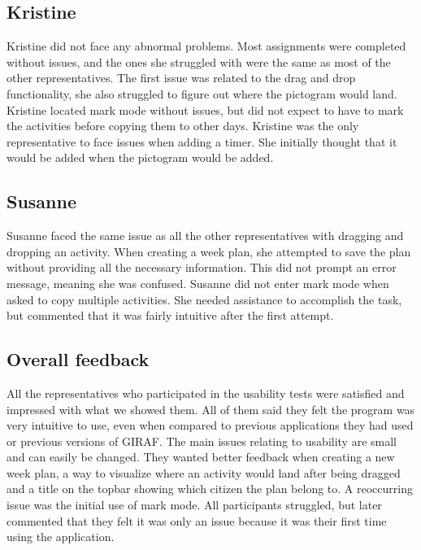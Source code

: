 \subsection{Kristine}
Kristine did not face any abnormal problems.
Most assignments were completed without issues, and the ones she struggled with were the same as most of the other representatives.
The first issue was related to the drag and drop functionality, she also struggled to figure out where the pictogram would land.
Kristine located mark mode without issues, but did not expect to have to mark the activities before copying them to other days. 
Kristine was the only representative to face issues when adding a timer. 
She initially thought that it would be added when the pictogram would be added.

\subsection{Susanne}
Susanne faced the same issue as all the other representatives with dragging and dropping an activity.
When creating a week plan, she attempted to save the plan without providing all the necessary information.
This did not prompt an error message, meaning she was confused.
Susanne did not enter mark mode when asked to copy multiple activities.
She needed assistance to accomplish the task, but commented that it was fairly intuitive after the first attempt.

\subsection{Overall feedback}
All the representatives who participated in the usability tests were satisfied and impressed with what we showed them.
All of them said they felt the program was very intuitive to use, even when compared to previous applications they had used or previous versions of GIRAF.
The main issues relating to usability are small and can easily be changed.
They wanted better feedback when creating a new week plan, a way to visualize where an activity would land after being dragged and a title on the topbar showing which citizen the plan belong to. 
A reoccurring issue was the initial use of mark mode.
All participants struggled, but later commented that they felt it was only an issue because it was their first time using the application.



